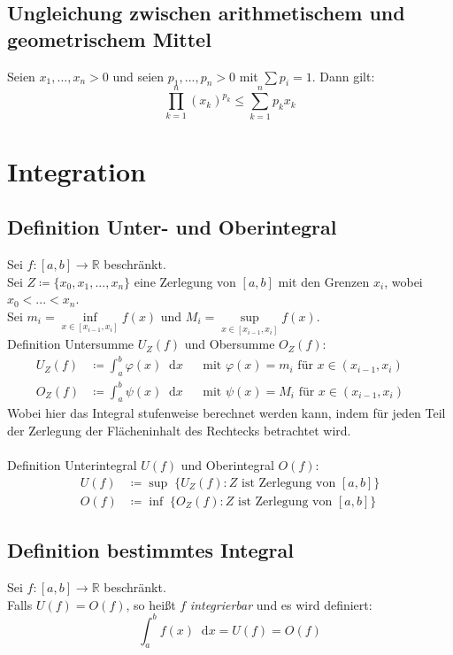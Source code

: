 \documentclass[halfparscip]{scrartcl}
\newcommand*\dif{\mathop{}\!\mathrm{d}}
\newcounter{subsection2}
\begin{document}
\subsection*{Ungleichung zwischen arithmetischem und geometrischem Mittel}
Seien $x_1,...,x_n > 0$ und seien $p_1, ..., p_n > 0$ mit $\sum p_i = 1$. Dann gilt:
\begin{equation*}
	\prod_{k=1}^{n}(x_k)^{p_k} \leq \sum_{k=1}^{n}p_kx_k
\end{equation*}

\newpage
\section{Integration}

\subsection*{Definition Unter- und Oberintegral}
Sei $f: [a,b] \rightarrow \mathbb{R}$ beschränkt.\\
Sei $Z \coloneqq \{x_0, x_1, ..., x_n\}$ eine Zerlegung von $[a,b]$ mit den Grenzen $x_i$, wobei $x_0 < ... < x_n$.\\
Sei $m_i = \inf\limits_{x \in [x_{i-1}, x_i]} f(x)$ und $M_i = \sup\limits_{x \in [x_{i-1}, x_i]} f(x)$.\\
Definition Untersumme $U_Z(f)$ und Obersumme $O_Z(f)$:
\begin{align*}
	U_Z(f) &\coloneqq \int_{a}^{b}\varphi(x) \dif x & &\text{mit } \varphi(x) = m_i \text{ für } x \in (x_{i-1}, x_i) & &\\
	O_Z(f) &\coloneqq \int_{a}^{b}\psi(x) \dif x & &\text{mit } \psi(x) = M_i \text{ für } x \in (x_{i-1}, x_i) & &
\end{align*}
Wobei hier das Integral stufenweise berechnet werden kann, indem für jeden Teil der Zerlegung der Flächeninhalt des Rechtecks betrachtet wird.\\\\ 
Definition Unterintegral $U(f)$ und Oberintegral $O(f)$:
\begin{align*}
	U(f) &\coloneqq \sup\; \{U_Z(f) : Z \text{ ist Zerlegung von } [a,b]\}\\
	O(f) &\coloneqq \inf\; \{O_Z(f) : Z \text{ ist Zerlegung von } [a,b]\}
\end{align*}

\subsection{Definition bestimmtes Integral}
Sei $f: [a,b] \rightarrow \mathbb{R}$ beschränkt. \\
Falls $U(f) = O(f)$, so heißt $f$ \textit{integrierbar} und es wird definiert:
\begin{equation*}
	\int_{a}^{b} f(x) \dif x = U(f) = O(f)
\end{equation*}
\end{document}

